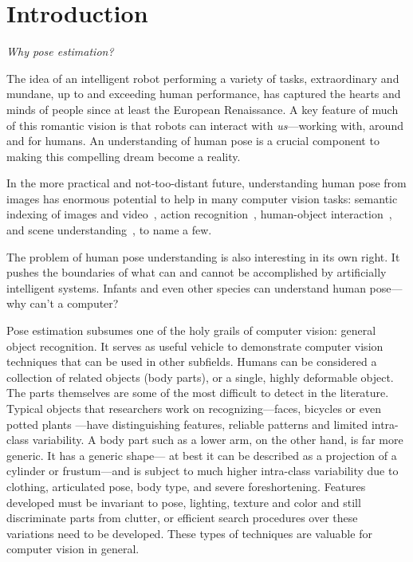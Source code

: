 \chapter{Introduction}
{\em Why pose estimation?}
\vspace{1cm}

The idea of an intelligent robot performing a variety of tasks, extraordinary 
and mundane, up to and exceeding human performance, has captured the hearts and 
minds of people since at least the European Renaissance.  A key feature of much 
of this romantic vision is that robots can interact with {\em us}---working 
with, around and for humans.  An understanding of human pose is a crucial 
component to making this compelling dream become a reality.  

In the more practical and not-too-distant future, understanding human pose from 
images has enormous potential to help in many computer vision tasks: semantic 
indexing of images and video~\citep{posesearch}, action 
recognition~\citep{pose-action11}, human-object interaction~\citep{bangpeng12}, 
and scene understanding~\citep{gupta11}, to name a few.   

The problem of human pose understanding is also interesting in its own right.  
It pushes the boundaries of what can and cannot be accomplished by artificially 
intelligent systems.  Infants and even other species can understand human 
pose---why can't a computer?  

Pose estimation subsumes one of the holy grails of computer vision: general 
object recognition.  It serves as useful vehicle to demonstrate computer vision 
techniques that can be used in other subfields.  Humans can be considered a 
collection of related objects (body parts), or a single, highly deformable 
object.  The parts themselves are some of the most difficult to detect in the 
literature.  Typical objects that researchers work on recognizing---faces, 
bicycles or even potted plants \citep{voc09}---have distinguishing features, 
reliable patterns and limited intra-class variability.  A body part such as a 
lower arm, on the other hand, is far more generic.  It has a generic shape---
at best it can be described as a projection of a cylinder or frustum---and is 
subject to much higher intra-class variability due to clothing, articulated 
pose, body type, and severe foreshortening.  Features developed must be 
invariant to pose, lighting, texture and color and still discriminate parts 
from clutter, or efficient search procedures over these variations need to be 
developed. These types of techniques are valuable for computer vision in 
general.

